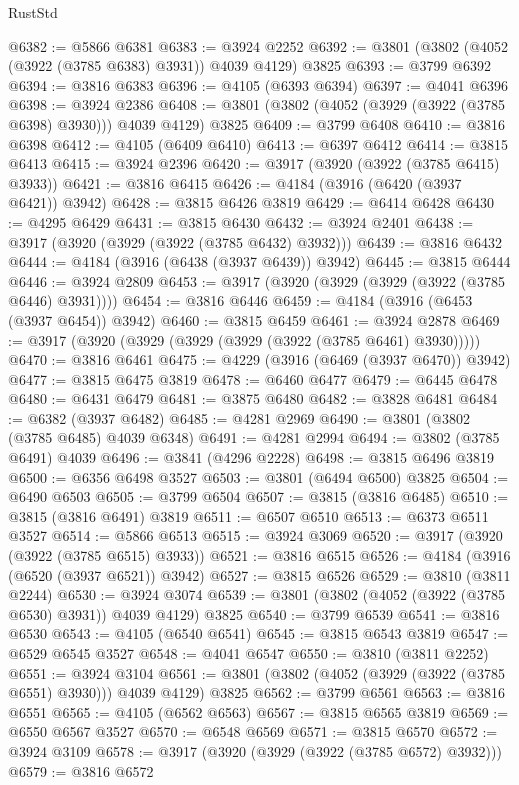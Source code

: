 \begin{lexlean}{RustStd}
\begin{coremodule}
@6382 := @5866 @6381
@6383 := @3924 @2252
@6392 := @3801 (@3802 (@4052 (@3922 (@3785 @6383) @3931)) @4039 @4129) @3825
@6393 := @3799 @6392
@6394 := @3816 @6383
@6396 := @4105 (@6393 @6394)
@6397 := @4041 @6396
@6398 := @3924 @2386
@6408 := @3801 (@3802 (@4052 (@3929 (@3922 (@3785 @6398) @3930))) @4039 @4129) @3825
@6409 := @3799 @6408
@6410 := @3816 @6398
@6412 := @4105 (@6409 @6410)
@6413 := @6397 @6412
@6414 := @3815 @6413
@6415 := @3924 @2396
@6420 := @3917 (@3920 (@3922 (@3785 @6415) @3933))
@6421 := @3816 @6415
@6426 := @4184 (@3916 (@6420 (@3937 @6421)) @3942)
@6428 := @3815 @6426 @3819
@6429 := @6414 @6428
@6430 := @4295 @6429
@6431 := @3815 @6430
@6432 := @3924 @2401
@6438 := @3917 (@3920 (@3929 (@3922 (@3785 @6432) @3932)))
@6439 := @3816 @6432
@6444 := @4184 (@3916 (@6438 (@3937 @6439)) @3942)
@6445 := @3815 @6444
@6446 := @3924 @2809
@6453 := @3917 (@3920 (@3929 (@3929 (@3922 (@3785 @6446) @3931))))
@6454 := @3816 @6446
@6459 := @4184 (@3916 (@6453 (@3937 @6454)) @3942)
@6460 := @3815 @6459
@6461 := @3924 @2878
@6469 := @3917 (@3920 (@3929 (@3929 (@3929 (@3922 (@3785 @6461) @3930)))))
@6470 := @3816 @6461
@6475 := @4229 (@3916 (@6469 (@3937 @6470)) @3942)
@6477 := @3815 @6475 @3819
@6478 := @6460 @6477
@6479 := @6445 @6478
@6480 := @6431 @6479
@6481 := @3875 @6480
@6482 := @3828 @6481
@6484 := @6382 (@3937 @6482)
@6485 := @4281 @2969
@6490 := @3801 (@3802 (@3785 @6485) @4039 @6348)
@6491 := @4281 @2994
@6494 := @3802 (@3785 @6491) @4039
@6496 := @3841 (@4296 @2228)
@6498 := @3815 @6496 @3819
@6500 := @6356 @6498 @3527
@6503 := @3801 (@6494 @6500) @3825
@6504 := @6490 @6503
@6505 := @3799 @6504
@6507 := @3815 (@3816 @6485)
@6510 := @3815 (@3816 @6491) @3819
@6511 := @6507 @6510
@6513 := @6373 @6511 @3527
@6514 := @5866 @6513
@6515 := @3924 @3069
@6520 := @3917 (@3920 (@3922 (@3785 @6515) @3933))
@6521 := @3816 @6515
@6526 := @4184 (@3916 (@6520 (@3937 @6521)) @3942)
@6527 := @3815 @6526
@6529 := @3810 (@3811 @2244)
@6530 := @3924 @3074
@6539 := @3801 (@3802 (@4052 (@3922 (@3785 @6530) @3931)) @4039 @4129) @3825
@6540 := @3799 @6539
@6541 := @3816 @6530
@6543 := @4105 (@6540 @6541)
@6545 := @3815 @6543 @3819
@6547 := @6529 @6545 @3527
@6548 := @4041 @6547
@6550 := @3810 (@3811 @2252)
@6551 := @3924 @3104
@6561 := @3801 (@3802 (@4052 (@3929 (@3922 (@3785 @6551) @3930))) @4039 @4129) @3825
@6562 := @3799 @6561
@6563 := @3816 @6551
@6565 := @4105 (@6562 @6563)
@6567 := @3815 @6565 @3819
@6569 := @6550 @6567 @3527
@6570 := @6548 @6569
@6571 := @3815 @6570
@6572 := @3924 @3109
@6578 := @3917 (@3920 (@3929 (@3922 (@3785 @6572) @3932)))
@6579 := @3816 @6572

\end{coremodule}
\end{lexlean}
